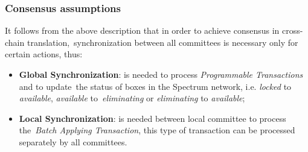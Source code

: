 \subsubsection{Consensus assumptions}
It follows from the above description that in order to achieve consensus in cross-chain translation,\
synchronization between all committees is necessary only for certain actions, thus:
\begin{itemize}
    \item \textbf{Global Synchronization}: is needed to process \textit{Programmable Transactions} and to update\
    the status of boxes in the Spectrum network, i.e. \textit{locked} to \textit{available}, \textit{available} to\
    \textit{eliminating} or \textit{eliminating} to \textit{available};
    \item \textbf{Local Synchronization}: is needed between local committee to process the\
    \textit{Batch Applying Transaction}, this type of transaction can be processed separately by all committees.
\end{itemize}